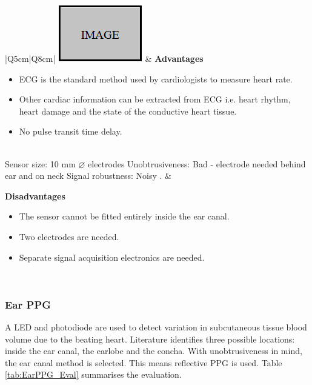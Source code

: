 \begin{table}[H]
\caption{Ear ECG}
\label{tab:EarECG_Eval}
\renewcommand{\arraystretch}{1.3}	%
\centering
\begin{tabular}{|Q{5cm}|Q{8cm}|} 
 \hline
\includegraphics[scale=1]{figs/Image.png} & 
	\textbf{Advantages}
	\begin{itemize}[leftmargin=1em, noitemsep, topsep=2pt]
  	\item ECG is the standard method used by cardiologists to measure heart rate.
  	\item Other cardiac information can be extracted from ECG i.e. heart rhythm, heart damage and the state of the conductive heart tissue.
  	\item No pulse transit time delay.
  	\end{itemize}\\
  	
\hline
Sensor size: 10 mm  ${\diameter}$ electrodes	\newline				
Unobtrusiveness: Bad - electrode needed behind ear and on neck \newline	
Signal robustness: Noisy \citep{winokur2012wearable}. 		&
	
	\textbf{Disadvantages}
	\begin{itemize}[leftmargin=1em, noitemsep, topsep=2pt]
 	\item The sensor cannot be fitted entirely inside the ear canal.
	\item Two electrodes are needed.
  	\item Separate signal acquisition electronics are needed.
  	\end{itemize}\\
 
\hline
\end{tabular}
\end{table}

\subsubsection{Ear PPG}
A LED and photodiode are used to detect variation in subcutaneous tissue blood volume due to the beating heart. Literature identifies three possible locations: inside the ear canal, the earlobe and the concha. With unobtrusiveness in mind, the ear canal method is selected. This means reflective PPG is used. Table \ref{tab:EarPPG_Eval} summarises the evaluation.

